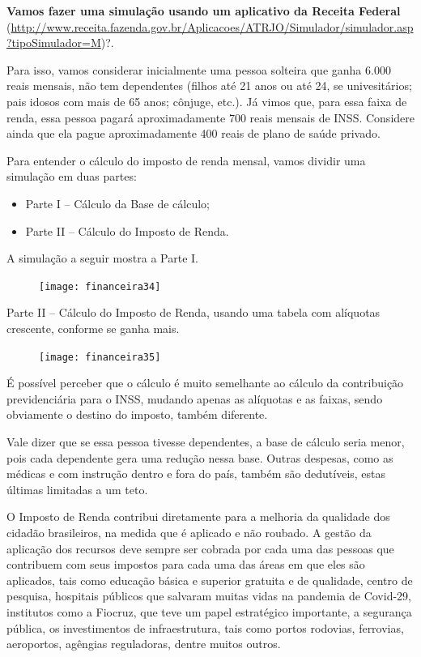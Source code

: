 \textbf{Vamos fazer uma simulação usando um aplicativo da Receita Federal} (\url{http://www.receita.fazenda.gov.br/Aplicacoes/ATRJO/Simulador/simulador.asp?tipoSimulador=M})?. 

Para isso, vamos considerar inicialmente uma pessoa solteira que ganha $6.000$ reais mensais, não tem dependentes (filhos até 21 anos ou até 24, se univesitários; pais idosos com mais de 65 anos; cônjuge, etc.). Já vimos que, para essa faixa de renda, essa pessoa pagará aproximadamente 700 reais mensais de INSS. Considere ainda que ela pague aproximadamente 400 reais de plano de saúde privado.

Para entender o cálculo do imposto de renda mensal, vamos dividir uma simulação em duas partes:

\begin{itemize}
  \item Parte I -- Cálculo da Base de cálculo;
  \item Parte II -- Cálculo do Imposto de Renda.
\end{itemize}

A simulação a seguir mostra a Parte I.

\begin{figure}[H]
\centering

\texttt{[image: financeira34]}
\end{figure}

\clearpage
Parte II -- Cálculo do Imposto de Renda, usando uma tabela com alíquotas crescente, conforme se ganha mais.

\begin{figure}[H]
\centering

\texttt{[image: financeira35]}
\end{figure}

É possível perceber que o cálculo é muito semelhante ao cálculo da contribuição previdenciária para o INSS, mudando apenas as alíquotas e as faixas, sendo obviamente o destino do imposto, também diferente.

Vale dizer que se essa pessoa tivesse dependentes, a base de cálculo seria menor, pois cada dependente gera uma redução nessa base. Outras despesas, como as médicas e com instrução dentro e fora do país, também são dedutíveis, estas últimas limitadas a um teto.

O Imposto de Renda contribui diretamente para a melhoria da qualidade dos cidadão brasileiros, na medida que é aplicado e não roubado. A gestão da aplicação dos recursos deve sempre ser cobrada por cada uma das pessoas que contribuem com seus impostos para cada uma das áreas em que eles são aplicados, tais como educação básica e superior gratuita e de qualidade, centro de pesquisa, hospitais públicos que salvaram muitas vidas na pandemia de Covid-29, institutos como a Fiocruz, que teve um papel estratégico importante, a segurança pública, os investimentos de infraestrutura, tais como portos rodovias, ferrovias, aeroportos, agêngias reguladoras, dentre muitos outros.

